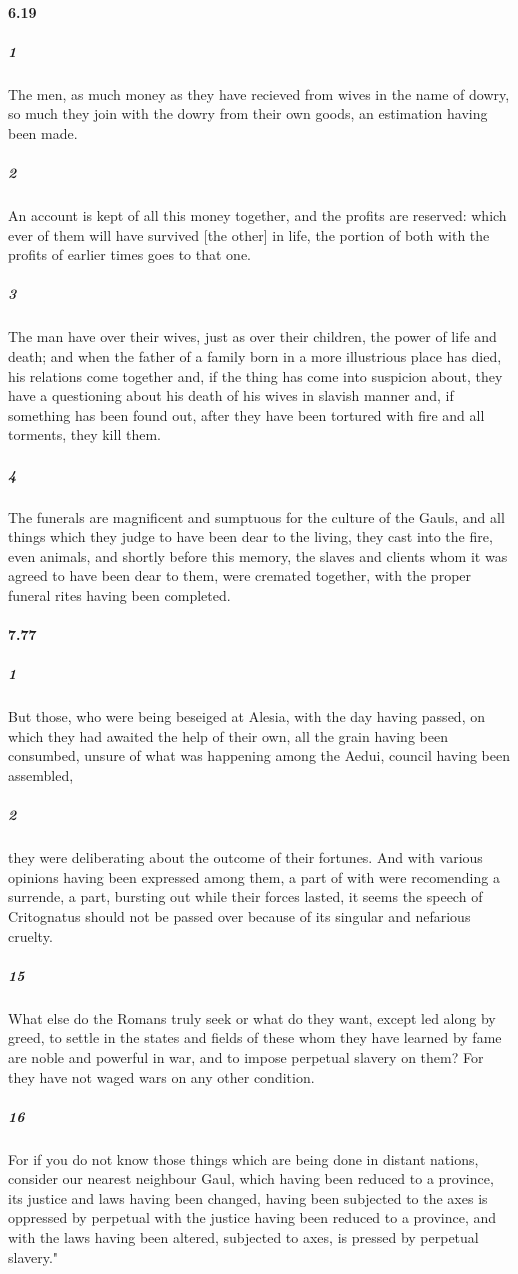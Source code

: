 \documentclass[12pt]{article}
\begin{document}
	\paragraph{6.19}
		\subparagraph{1}
			The men, as much money as they have recieved from wives in the name of dowry, so much they join with the dowry from their own goods, an estimation having been made.
		\subparagraph{2}
			An account is kept of all this money together, and the profits are reserved: which ever of them will have survived [the other] in life, the portion of both with the profits of earlier times goes to that one.
		\subparagraph{3}
			The man have over their wives, just as over their children, the power of life and death; and when the father of a family born in a more illustrious place has died, his relations come together and, if the thing has come into suspicion about, they have a questioning about his death of his wives in slavish manner and, if something has been found out, after they have been tortured with fire and all torments, they kill them.
		\subparagraph{4}
			The funerals are magnificent and sumptuous for the culture of the Gauls, and all things which they judge to have been dear to the living, they cast into the fire, even animals, and shortly before this memory, the slaves and clients whom it was agreed to have been dear to them, were cremated together, with the proper funeral rites having been completed.

	\paragraph{7.77}
		\subparagraph{1}
			But those, who were being beseiged at Alesia, with the day having passed, on which they had awaited the help of their own, all the grain having been consumbed, unsure of what was happening among the Aedui, council having been assembled,
		\subparagraph{2}
			they were deliberating about the outcome of their fortunes. And with various opinions having been expressed among them, a part of with were recomending a surrende, a part, bursting out while their forces lasted, it seems the speech of Critognatus should not be passed over because of its singular and nefarious cruelty.
		\subparagraph{15}
			What else do the Romans truly seek or what do they want, except led along by greed, to settle in the states and fields of these whom they have learned by fame are noble and powerful in war, and to impose perpetual slavery on them? For they have not waged wars on any other condition.
		\subparagraph{16}
			For if you do not know those things which are being done in distant nations, consider our nearest neighbour Gaul, which having been reduced to a province, its justice and laws having been changed, having been subjected to the axes is oppressed by perpetual with the justice having been reduced to a province, and with the laws having been altered, subjected to axes, is pressed by perpetual slavery."
\end{document}
